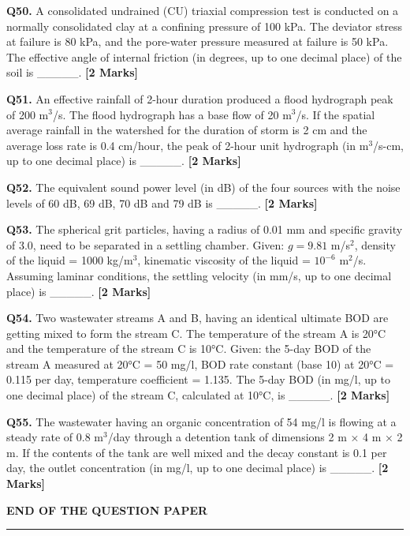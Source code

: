 \documentclass[11pt]{article}
\newcommand{\questionb}[2]{
    \noindent\textbf{Q#2.} #1 \hfill \textbf{[2 Marks]}
}
\begin{document}
\vspace{0.5cm}

\questionb{A consolidated undrained (CU) triaxial compression test is conducted on a normally consolidated clay at a confining pressure of 100 kPa. The deviator stress at failure is 80 kPa, and the pore-water pressure measured at failure is 50 kPa. The effective angle of internal friction (in degrees, up to one decimal place) of the soil is \_\_\_\_\_.}{50}

\vspace{0.5cm}

\questionb{An effective rainfall of 2-hour duration produced a flood hydrograph peak of 200 m$^3$/s. The flood hydrograph has a base flow of 20 m$^3$/s. If the spatial average rainfall in the watershed for the duration of storm is 2 cm and the average loss rate is 0.4 cm/hour, the peak of 2-hour unit hydrograph (in m$^3$/s-cm, up to one decimal place) is \_\_\_\_\_.}{51}

\vspace{0.5cm}

\questionb{The equivalent sound power level (in dB) of the four sources with the noise levels of 60 dB, 69 dB, 70 dB and 79 dB is \_\_\_\_\_.}{52}

\vspace{0.5cm}

\questionb{The spherical grit particles, having a radius of 0.01 mm and specific gravity of 3.0, need to be separated in a settling chamber. Given: $g = 9.81$ m/s$^2$, density of the liquid = 1000 kg/m$^3$, kinematic viscosity of the liquid = $10^{-6}$ m$^2$/s. Assuming laminar conditions, the settling velocity (in mm/s, up to one decimal place) is \_\_\_\_\_.}{53}

\vspace{0.5cm}

\questionb{Two wastewater streams A and B, having an identical ultimate BOD are getting mixed to form the stream C. The temperature of the stream A is 20°C and the temperature of the stream C is 10°C. Given: the 5-day BOD of the stream A measured at 20°C = 50 mg/l, BOD rate constant (base 10) at 20°C = 0.115 per day, temperature coefficient = 1.135. The 5-day BOD (in mg/l, up to one decimal place) of the stream C, calculated at 10°C, is \_\_\_\_\_.}{54}

\vspace{0.5cm}

\questionb{The wastewater having an organic concentration of 54 mg/l is flowing at a steady rate of 0.8 m$^3$/day through a detention tank of dimensions 2 m × 4 m × 2 m. If the contents of the tank are well mixed and the decay constant is 0.1 per day, the outlet concentration (in mg/l, up to one decimal place) is \_\_\_\_\_.}{55}

\vspace{0.5cm}

\vspace{5cm}
\begin{center}
\textbf{END OF THE QUESTION PAPER}
\rule{\textwidth}{0.5pt} 
\end{center}
\end{document}

